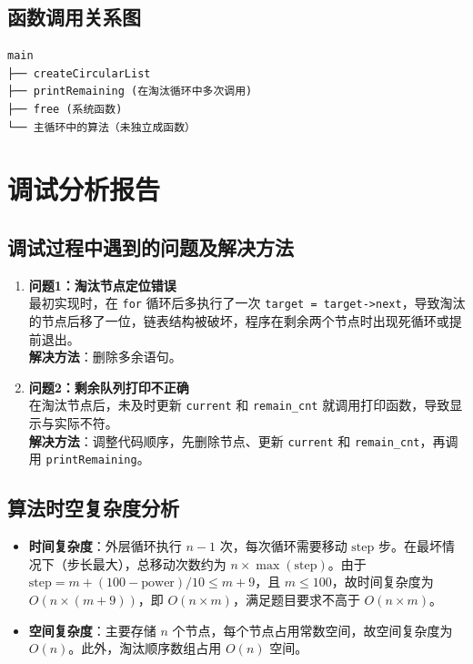 \documentclass[UTF8]{ctexart}
\begin{document}
\subsection{函数调用关系图}
\begin{verbatim}
main
├── createCircularList
├── printRemaining (在淘汰循环中多次调用)
├── free (系统函数)
└── 主循环中的算法（未独立成函数）
\end{verbatim}

\section{调试分析报告}

\subsection{调试过程中遇到的问题及解决方法}
\begin{enumerate}
    \item \textbf{问题1：淘汰节点定位错误} \\
    最初实现时，在 \texttt{for} 循环后多执行了一次 \texttt{target = target->next}，导致淘汰的节点后移了一位，链表结构被破坏，程序在剩余两个节点时出现死循环或提前退出。 \\
    \textbf{解决方法}：删除多余语句。

    \item \textbf{问题2：剩余队列打印不正确} \\
    在淘汰节点后，未及时更新 \texttt{current} 和 \texttt{remain\_cnt} 就调用打印函数，导致显示与实际不符。 \\
    \textbf{解决方法}：调整代码顺序，先删除节点、更新 \texttt{current} 和 \texttt{remain\_cnt}，再调用 \texttt{printRemaining}。
\end{enumerate}

\subsection{算法时空复杂度分析}
\begin{itemize}
    \item \textbf{时间复杂度}：外层循环执行 \( n-1 \) 次，每次循环需要移动 \( \mathrm{step} \) 步。在最坏情况下（步长最大），总移动次数约为 \( n \times \max(\mathrm{step}) \)。由于 \( \mathrm{step} = m + (100 - \mathrm{power})/10 \leq m + 9 \)，且 \( m \leq 100 \)，故时间复杂度为 \( O(n \times (m+9)) \)，即 \( O(n \times m) \)，满足题目要求不高于 \( O(n \times m) \)。
    \item \textbf{空间复杂度}：主要存储 \( n \) 个节点，每个节点占用常数空间，故空间复杂度为 \( O(n) \)。此外，淘汰顺序数组占用 \( O(n) \) 空间。
\end{itemize}
\end{document}
